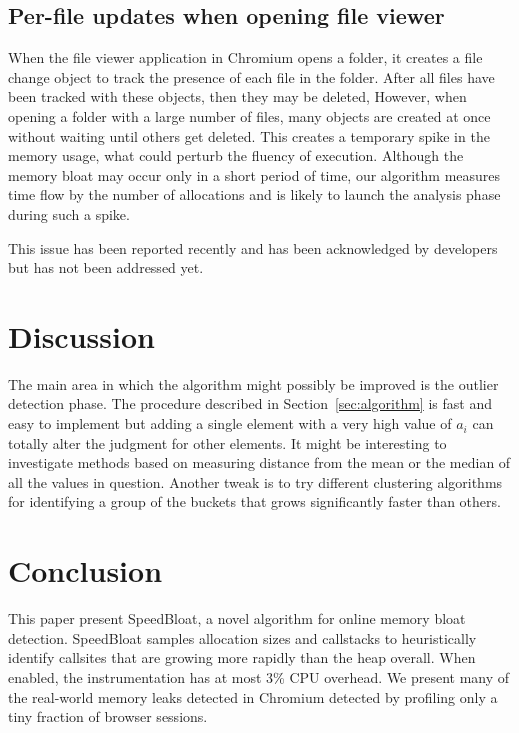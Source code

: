 \documentclass[preprint, numbers]{sigplanconf}
\begin{document}
\subsection{Per-file updates when opening file viewer \cite{bug-files}}

When the file viewer application in Chromium opens a folder, it creates a file change object to track the presence of each file in the folder.
After all files have been tracked with these objects, then they may be deleted,
However, when opening a folder with a large number of files, many objects are created at once
without waiting until others get deleted.
This creates a temporary spike in the memory usage, what could perturb the fluency of execution.
Although the memory bloat may occur only in a short period of time,
our algorithm measures time flow by the number of allocations and
is likely to launch the analysis phase during such a spike.

This issue has been reported recently and
has been acknowledged by developers but has not been addressed yet.

\section{Discussion}

The main area in which the algorithm might possibly be improved is
the outlier detection phase.
The procedure described in Section~\ref{sec:algorithm} is fast and easy to implement
but adding a single element with a very high value of $a_i$ can totally alter the judgment
for other elements.
It might be interesting to investigate methods based on measuring distance from the mean or the median
of all the values in question.
Another tweak is to try different clustering algorithms for identifying a group of the buckets that grows
significantly faster than others.

\section{Conclusion}

This paper present SpeedBloat, a novel algorithm for online memory
bloat detection.  SpeedBloat samples allocation sizes and callstacks
to heuristically identify callsites that are growing more rapidly than
the heap overall.  When enabled, the instrumentation has at most 3\%
CPU overhead.  We present many of the real-world memory leaks detected
in Chromium detected by profiling only a tiny fraction of browser
sessions.






\end{document}
